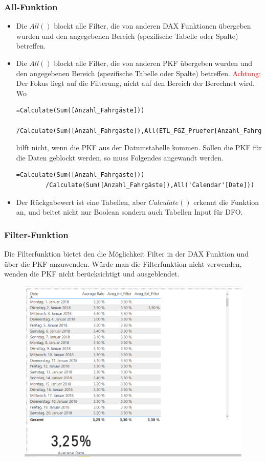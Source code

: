 \subsubsection{All-Funktion}
\begin{itemize}
	\item Die $All()$ blockt alle Filter, die von anderen \gls{DAX} Funktionen übergeben wurden und den angegebenen Bereich (spezifische Tabelle oder Spalte) betreffen.
	\item Die $All()$ blockt alle Filter, die von anderen \gls{PKF} übergeben wurden und den angegebenen Bereich (spezifische Tabelle oder Spalte) betreffen. \textcolor{red}{Achtung:} Der Fokus liegt auf die Filterung, nicht auf den Bereich der Berechnet wird.
	Wo
	\begin{lstlisting}[style=DAX]
		=Calculate(Sum([Anzahl_Fahrgäste]))
		/Calculate(Sum([Anzahl_Fahrgäste]),All(ETL_FGZ_Pruefer[Anzahl_Fahrgäste]))
	\end{lstlisting}
	hilft nicht, wenn die \gls{PKF} aus der Datumstabelle kommen. Sollen die \gls{PKF} für die Daten geblockt werden, so muss Folgendes angewandt werden.
	\begin{lstlisting}[style=DAX]
		=Calculate(Sum([Anzahl_Fahrgäste]))
		/Calculate(Sum([Anzahl_Fahrgäste]),All('Calendar'[Date]))
	\end{lstlisting}
	\item Der Rückgabewert ist eine Tabellen, aber $Calculate()$ erkennt die Funktion an, und beitet nicht nur Boolean sondern auch Tabellen Input für \gls{DFO}.
\end{itemize}
\subsubsection{Filter-Funktion}
Die Filterfunktion bietet den die Möglichkeit Filter in der DAX Funktion und über die \gls{PKF} anzuwenden. Würde man die Filterfunktion nicht verwenden, wenden die \gls{PKF} nicht berücksichtigt und ausgeblendet.
\begin{figure}[H]
	\centering
	\includegraphics[scale = 0.3]{attachment/chapter_1/Scc146}
\end{figure}

